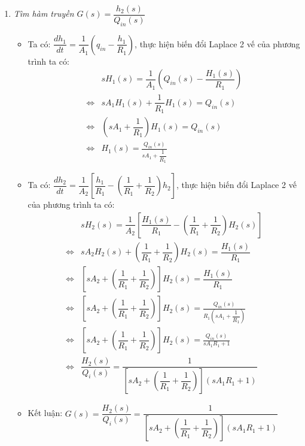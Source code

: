 \documentclass[12pt,a4paper]{article}
\begin{document}
\begin{enumerate}[\it a.]
            \item \textit{Tìm hàm truyền $G(s) = \dfrac{h_2(s)}{Q_{in}(s)}$}
                \begin{itemize}
                    \item Ta có: $\dfrac{d h_1}{dt} = \dfrac{1}{A_1} \left({q_{in} - \dfrac{h_1}{R_1}}\right)$, thực hiện biến đổi Laplace 2 vế của phương trình ta có:
                        \begin{align}
                            & s H_1(s) = \dfrac{1}{A_1} \left({Q_{in}(s) - \dfrac{H_1 (s)}{R_1}}\right)\\
                            \Longleftrightarrow & s A_1 H_1(s) + \dfrac{1}{R_1} H_1 (s) = Q_{in}(s)\\
                            \Longleftrightarrow & \left({s A_1 + \dfrac{1}{R_1} }\right) H_1 (s) = Q_{in}(s) \\
                            \Longleftrightarrow & H_1(s) = \frac{Q_{in} (s)}{s A_1 + \dfrac{1}{R_1}}
                        \end{align}

                    \item Ta có: $\dfrac{d h_2}{dt} = \dfrac{1}{A_2} \left[{\dfrac{h_1}{R_1} - \left({\dfrac{1}{R_1} + \dfrac{1}{R_2}}\right) h_2}\right]$, thực hiện biến đổi Laplace 2 vế của phương trình ta có:
                        \begin{align}
                            & s H_2(s) = \dfrac{1}{A_2} \left[{ \dfrac{H_1(s)}{R_1} - \left({\dfrac{1}{R_1} + \dfrac{1}{R_2}}\right) H_2(s) }\right] \\
                            \Longleftrightarrow & s A_2 H_2(s) + \left({\dfrac{1}{R_1} + \dfrac{1}{R_2}}\right) H_2(s) = \dfrac{H_1(s)}{R_1} \\
                            \Longleftrightarrow & \left[{s A_2 + \left({\dfrac{1}{R_1} + \dfrac{1}{R_2}}\right) }\right] H_2 (s) = \dfrac{H_1(s)}{R_1}\\
                            \Longleftrightarrow & \left[{s A_2 + \left({\dfrac{1}{R_1} + \dfrac{1}{R_2}}\right) }\right] H_2 (s) =  \frac{Q_{in} (s)}{R_1 \left({s A_1 + \dfrac{1}{R_1}}\right)}\\
                            \Longleftrightarrow & \left[{s A_2 + \left({\dfrac{1}{R_1} + \dfrac{1}{R_2}}\right) }\right] H_2 (s) =  \frac{Q_{in} (s)}{s A_1 R_1 + 1} \\
                            \Longleftrightarrow & \dfrac{H_2(s)}{Q_i(s)} = \dfrac{1}{\left[{s A_2 + \left({\dfrac{1}{R_1} + \dfrac{1}{R_2}}\right) }\right]  \left({ s A_1 R_1 + 1 }\right)}
                        \end{align}

                    \item Kết luận: $G(s) = \dfrac{H_2(s)}{Q_i(s)} = \dfrac{1}{\left[{s A_2 + \left({\dfrac{1}{R_1} + \dfrac{1}{R_2}}\right) }\right]  \left({ s A_1 R_1 + 1 }\right)}$
                \end{itemize}
        \end{enumerate}
\end{document}
